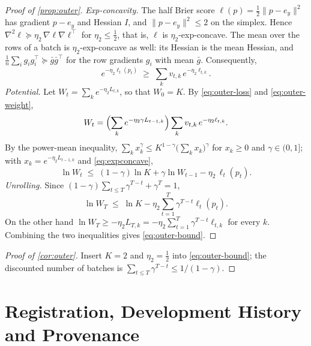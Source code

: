 \documentclass[11pt]{article}
\theoremstyle{plain}
\theoremstyle{definition}
\theoremstyle{remark}
\begin{document}
\begin{proof}[Proof of \cref{prop:outer}]
\emph{Exp-concavity.} The half Brier score $\ell(p)=\tfrac12\lVert p-e_y\rVert^2$ has gradient $p-e_y$ and Hessian
$I$, and $\lVert p-e_y\rVert^2\le2$ on the simplex. Hence
$\nabla^2\ell\succeq\eta_2\,\nabla\ell\nabla\ell^{\top}$ for $\eta_2\le\tfrac12$, that is, $\ell$ is
$\eta_2$-exp-concave. The mean over the rows of a batch is $\eta_2$-exp-concave as well: its Hessian is the mean
Hessian, and $\tfrac1n\sum_ig_ig_i^\top\succeq\bar g\bar g^\top$ for the row gradients $g_i$ with mean $\bar g$.
Consequently,
\begin{equation}\label{eq:expconcave}
  e^{-\eta_2\ell_t(p_t)}\;\ge\;\sum_kv_{t,k}\,e^{-\eta_2\ell_{t,k}} .
\end{equation}
\emph{Potential.} Let $W_t=\sum_ke^{-\eta_2L_{t,k}}$, so that $W_0=K$. By \eqref{eq:outer-loss} and
\eqref{eq:outer-weight},
\[
  W_t=\Bigl(\sum_ke^{-\eta_2\gamma L_{t-1,k}}\Bigr)\sum_kv_{t,k}\,e^{-\eta_2\ell_{t,k}} .
\]
By the power-mean inequality, $\sum_kx_k^{\gamma}\le K^{1-\gamma}\bigl(\sum_kx_k\bigr)^{\gamma}$ for $x_k\ge0$ and
$\gamma\in(0,1]$; with $x_k=e^{-\eta_2L_{t-1,k}}$ and \eqref{eq:expconcave},
\[
  \ln W_t\;\le\;(1-\gamma)\ln K+\gamma\ln W_{t-1}-\eta_2\,\ell_t(p_t).
\]
\emph{Unrolling.} Since $(1-\gamma)\sum_{t\le T}\gamma^{T-t}+\gamma^{T}=1$,
\[
  \ln W_T\;\le\;\ln K-\eta_2\sum_{t=1}^{T}\gamma^{T-t}\ell_t(p_t).
\]
On the other hand $\ln W_T\ge-\eta_2L_{T,k}=-\eta_2\sum_{t=1}^{T}\gamma^{T-t}\ell_{t,k}$ for every $k$. Combining the
two inequalities gives \eqref{eq:outer-bound}.
\end{proof}

\begin{proof}[Proof of \cref{cor:outer}]
Insert $K=2$ and $\eta_2=\tfrac12$ into \eqref{eq:outer-bound}; the discounted number of batches is
$\sum_{t\le T}\gamma^{T-t}\le1/(1-\gamma)$.
\end{proof}

\section{Registration, Development History and Provenance}
\label{app:prereg}
\end{document}
